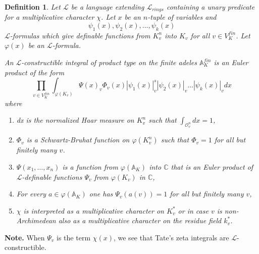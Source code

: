 \documentclass[12pt]{amsart}
\def\A{\mathbb{A}}
\def\C{\mathbb{C}}
\def\cL{\mathcal{L}}
\def\C{\mathbb{C}}
\def\cL{\mathcal{L}}
\def\cO{\mathcal{O}}
\newtheorem{Def}{Definition}[section]
\numberwithin{equation}{section}
\begin{document}
\begin{Def}\label{con-gen} Let $\cL$ be a language extending $\cL_{rings}$ containing a unary predicate for a multiplicative character $\chi$. 
Let $x$ be an $n$-tuple of variables and 
$$\psi_1(x),\psi_2(x),\dots,\psi_k(x)$$ $\cL$-formulas which give definable functions from $K_v^n$ into $K_v$ for all $v\in V_K^{fin}$. 
Let $\varphi(x)$ be an $\cL$-formula. 


An $\cL$-constructible integral of product type on the finite adeles $\A_K^{fin}$ is an Euler product of the form
$$\prod_{v\in V_K^{fin}} \int_{\varphi(K_v)}\Psi(x)_v \Phi_v(x) |\psi_1(x)|_v^s |\psi_2(x)|_v\dots |\psi_k(x)|_v dx$$
where
\begin{enumerate}
\item dx is the normalized Haar measure on $K_v^n$ such that $\int_{\cO_v^n}dx=1$,
\item$\Phi_v$ is a Schwartz-Bruhat function on $\varphi(K_v^n)$ such that $\Phi_v=1$ for all but finitely many $v$. 
\item $\Psi(x_1,\dots,x_n)$ is a function from $\varphi(\A_K)$ into $\C$ that is an Euler product of $\cL$-definable
functions $\Psi_v$ from $\varphi(K_v)$ in $\C$,
\item For every $a\in \varphi(\A_K)$ one has $\Psi_v(a(v))=1$ for all but finitely many $v$,
\item $\chi$ is interpreted as a multiplicative character on $K_v^*$ or in case $v$ is non-Archimedean also as a multiplicative character on the residue field $k_v^*$.
\end{enumerate}
 \end{Def}

{\bf Note.} When $\Psi_v$ is the term $\chi(x)$, we see that Tate's zeta integrals are $\cL$-constructible.
\end{document}
